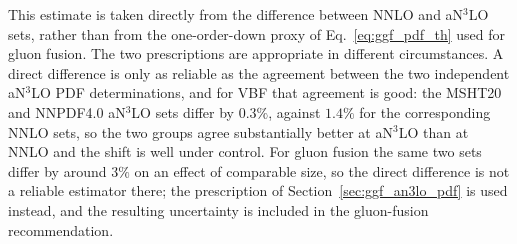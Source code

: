 This estimate is taken directly from the difference between NNLO and aN$^3$LO
sets, rather than from the one-order-down proxy of Eq.~\eqref{eq:ggf_pdf_th}
used for gluon fusion. The two prescriptions are appropriate in different
circumstances. A direct difference is only as reliable as the agreement between
the two independent aN$^3$LO PDF determinations, and for VBF that agreement is
good: the MSHT20 and NNPDF4.0 aN$^3$LO sets differ by $0.3\%$, against $1.4\%$
for the corresponding NNLO sets, so the two groups agree substantially better
at aN$^3$LO than at NNLO and the shift is well under control. For gluon fusion the
same two sets differ by around $3\%$ on an effect of comparable size, so the
direct difference is not a reliable estimator there; the prescription of
Section~\ref{sec:ggf_an3lo_pdf} is used instead, and the resulting uncertainty
is included in the gluon-fusion recommendation.
